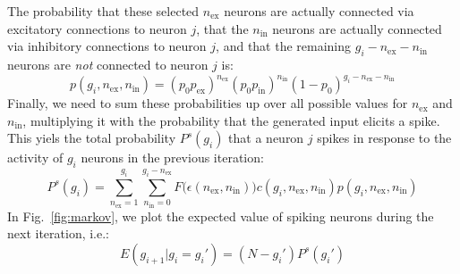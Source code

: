 \documentclass[10pt,a4paper,onecolumn]{article}
\begin{document}
The probability that these selected $n_\text{ex}$ neurons are actually connected via excitatory connections to neuron $j$, that the $n_\text{in}$ neurons are actually connected via inhibitory connections to neuron $j$, and that the remaining $g_i - n_\text{ex} - n_\text{in}$ neurons are \emph{not} connected to neuron $j$ is:
\begin{equation}
p(g_i, n_\text{ex}, n_\text{in}) = (p_0 p_\text{ex})^{n_\text{ex}} (p_0 p_\text{in})^{n_\text{in}} (1 - p_0)^{g_i - n_\text{ex} - n_\text{in}}
\end{equation}
Finally, we need to sum these probabilities up over all possible values for $n_\text{ex}$ and $n_\text{in}$, multiplying it with the probability that the generated input elicits a spike. This yiels the total probability $P^s(g_i)$ that a neuron $j$ spikes in response to the activity of $g_i$ neurons in the previous iteration:
\begin{equation}
P^s(g_i) = \sum_{n_\text{ex}=1}^{g_i}\sum_{n_\text{in}=0}^{g_i-n_\text{ex}} F\big(\epsilon(n_\text{ex}, n_\text{in})\big) c(g_i, n_\text{ex}, n_\text{in}) p(g_i, n_\text{ex}, n_\text{in})
\end{equation}
In Fig.~\ref{fig:markov}, we plot the expected value of spiking neurons during the next iteration, i.e.:
\begin{equation}
E(g_{i+1}|g_i = g_i') = (N - g_i') P^s(g_i')
\end{equation}
\end{document}
